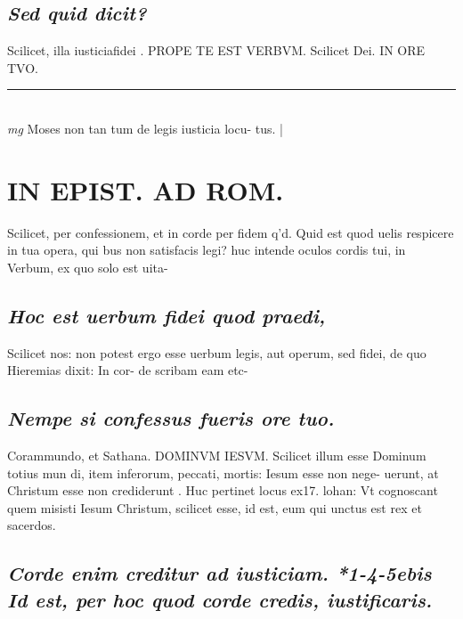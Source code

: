 \documentclass{article}
\begin{document}
\begin{pages}
\subsection*{\textit{Sed quid dicit? }}\pstart Scilicet, illa iusticiafidei . PROPE TE EST VERBVM. Scilicet Dei. IN ORE TVO.   \pend
\vspace{0.5cm}\noindent
\vspace{0.2cm}\rule{1cm}{0.2pt}\\ 
\hspace{0.2cm}\textit{mg}
\footnotesize Moses non tan tum de legis iusticia locu- tus.  
\normalsize| 
\section*{IN EPIST. AD ROM.  }
\marginpar{[ p.120 ]}\pstart Scilicet, per confessionem, et in corde per fidem q'd. Quid est quod uelis respicere in tua opera, qui bus non satisfacis legi? huc intende oculos cordis tui, in Verbum, ex quo solo est uita-  \pend
{}
{}
\subsection*{\textit{Hoc est uerbum fidei quod praedi, }}\pstart Scilicet nos: non potest ergo esse uerbum legis, aut operum, sed fidei, de quo Hieremias dixit: In cor- de scribam eam etc-  \pend
{}
{}
\subsection*{\textit{Nempe si confessus fueris ore tuo.  }}\pstart Corammundo, et Sathana. DOMINVM IESVM. Scilicet illum esse Dominum totius mun di, item inferorum, peccati, mortis: Iesum esse non nege- uerunt, at Christum esse non crediderunt . Huc pertinet locus ex17. lohan: Vt cognoscant quem misisti Iesum Christum, scilicet esse, id est, eum qui unctus est rex et sacerdos.   \pend
{}
{}
\subsection*{\textit{Corde enim creditur ad iusticiam. *1-4-5ebis Id est, per hoc quod corde credis, iustificaris.  }}
{}

\end{pages}
\end{document}
